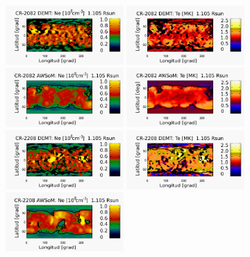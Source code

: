 \documentclass[baaa]{baaa}
\begin{document}
\begin{figure}[h!]
  \centering
  \includegraphics[width=0.4\textwidth]{map_Ne_CR2082_DEMT-EUVI_behind_H1-L3523_r3d_1105_Rsun_3.pdf}
  \includegraphics[width=0.4\textwidth]{map_Tm_CR2082_DEMT-EUVI_behind_H1-L3523_r3d_1105_Rsun_3.pdf}
  \includegraphics[width=0.4\textwidth]{map_Ne_awsom_2082_185_short_1105_Rsun_3.pdf}
  \includegraphics[width=0.4\textwidth]{map_Te_awsom_2082_185_short_1105_Rsun_3.pdf}
  \includegraphics[width=0.4\textwidth]{map_Ne_CR2208_DEMT-AIA_H1_L522_r3d_1105_Rsun_3.pdf}
  \includegraphics[width=0.4\textwidth]{map_Tm_CR2208_DEMT-AIA_H1_L522_r3d_1105_Rsun_3.pdf}  
  \includegraphics[width=0.4\textwidth]{map_Ne_awsom_2208_185_short_1105_Rsun_3.pdf}

\end{figure}
\end{document}
